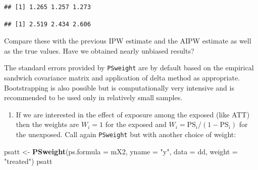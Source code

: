 \documentclass[
]{book}
\newenvironment{Shaded}{\begin{snugshade}}{\end{snugshade}}
\newcommand{\AttributeTok}[1]{\textcolor[rgb]{0.13,0.29,0.53}{#1}}
\newcommand{\DecValTok}[1]{\textcolor[rgb]{0.00,0.00,0.81}{#1}}
\newcommand{\FunctionTok}[1]{\textcolor[rgb]{0.13,0.29,0.53}{\textbf{#1}}}
\newcommand{\NormalTok}[1]{#1}
\newcommand{\OtherTok}[1]{\textcolor[rgb]{0.56,0.35,0.01}{#1}}
\newcommand{\SpecialCharTok}[1]{\textcolor[rgb]{0.81,0.36,0.00}{\textbf{#1}}}
\newcommand{\StringTok}[1]{\textcolor[rgb]{0.31,0.60,0.02}{#1}}
\providecommand{\tightlist}{%
  \setlength{\itemsep}{0pt}\setlength{\parskip}{0pt}}
\begin{document}
\begin{Shaded}
\end{Shaded}

\begin{verbatim}
## [1] 1.265 1.257 1.273
\end{verbatim}

\begin{Shaded}
\end{Shaded}

\begin{verbatim}
## [1] 2.519 2.434 2.606
\end{verbatim}

Compare these with the previous IPW estimate and the
AIPW estimate as well as the
true values. Have we obtained nearly unbiased results?

The standard errors provided by
\texttt{PSweight} are by default based on the empirical sandwich
covariance matrix and application
of delta method as appropriate. Bootstrapping is also possible but is
computationally very intensive and is
recommended to be used only in relatively small samples.

\begin{enumerate}
\def\labelenumi{\arabic{enumi}.}
\setcounter{enumi}{3}
\tightlist
\item
  If we are interested in the effect of exposure among the exposed
  (like ATT)
  then the weights are \(W_i = 1\) for the exposed and
  \(W_i = \text{PS}_i/(1-\text{PS}_i)\) for the unexposed.
  Call again \texttt{PSweight} but with another choice of weight:
\end{enumerate}

\begin{Shaded}
\begin{Highlighting}[]
\NormalTok{psatt }\OtherTok{\textless{}{-}} \FunctionTok{PSweight}\NormalTok{(}\AttributeTok{ps.formula =}\NormalTok{ mX2, }\AttributeTok{yname =} \StringTok{"y"}\NormalTok{, }\AttributeTok{data =}\NormalTok{ dd, }\AttributeTok{weight =} \StringTok{"treated"}\NormalTok{)}
\NormalTok{psatt}
\end{Highlighting}
\end{Shaded}
\end{document}
